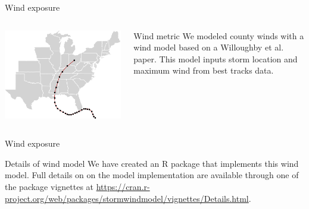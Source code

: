 \documentclass[ignorenonframetext,]{beamer}
\begin{document}
\begin{frame}{Wind exposure}

\begin{columns}
\begin{column}{0.7\textwidth}

\includegraphics[width=\textwidth]{anderson_jan18_files/figure-beamer/unnamed-chunk-4-1} 
\end{column}
\begin{column}{0.3\textwidth}
\small
\begin{block}{Wind metric}
We modeled county winds with a wind model based on a Willoughby et al. paper. This model inputs storm location and maximum wind from best tracks data. 
\end{block}
\end{column}
\end{columns}

\end{frame}

\begin{frame}{Wind exposure}

\begin{block}{Details of wind model}
We have created an R package that implements this wind model. Full details on on the model implementation are available through one of the package vignettes at \url{https://cran.r-project.org/web/packages/stormwindmodel/vignettes/Details.html}. 
\end{block}

\end{frame}
\end{document}
